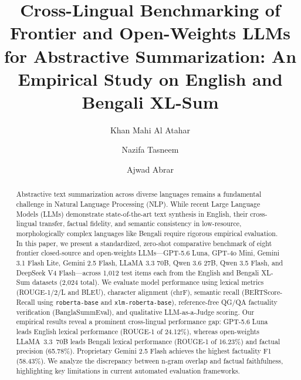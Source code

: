 \documentclass[runningheads]{llncs}
\begin{document}
\title{Cross-Lingual Benchmarking of Frontier and Open-Weights LLMs for Abstractive Summarization: An Empirical Study on English and Bengali XL-Sum}


\author{Khan Mahi Al Atahar \and
Nazifa Tasneem \and
Ajwad Abrar}



\maketitle              %

\begin{abstract}
Abstractive text summarization across diverse languages remains a fundamental challenge in Natural Language Processing (NLP). While recent Large Language Models (LLMs) demonstrate state-of-the-art text synthesis in English, their cross-lingual transfer, factual fidelity, and semantic consistency in low-resource, morphologically complex languages like Bengali require rigorous empirical evaluation. In this paper, we present a standardized, zero-shot comparative benchmark of eight frontier closed-source and open-weights LLMs---GPT-5.6 Luna, GPT-4o Mini, Gemini 3.1 Flash Lite, Gemini 2.5 Flash, LLaMA 3.3 70B, Qwen 3.6 27B, Qwen 3.5 Flash, and DeepSeek V4 Flash---across 1,012 test items each from the English and Bengali XL-Sum datasets (2,024 total). We evaluate model performance using lexical metrics (ROUGE-1/2/L and BLEU), character alignment (chrF), semantic recall (BERTScore-Recall using \texttt{roberta-base} and \texttt{xlm-roberta-base}), reference-free QG/QA factuality verification (BanglaSummEval), and qualitative LLM-as-a-Judge scoring. Our empirical results reveal a prominent cross-lingual performance gap: GPT-5.6 Luna leads English lexical performance (ROUGE-1 of 24.12\%), whereas open-weights LLaMA~3.3~70B leads Bengali lexical performance (ROUGE-1 of 16.23\%) and factual precision (65.78\%). Proprietary Gemini 2.5 Flash achieves the highest factuality F1 (58.43\%). We analyze the discrepancy between n-gram overlap and factual faithfulness, highlighting key limitations in current automated evaluation frameworks.

\end{abstract}
\end{document}
